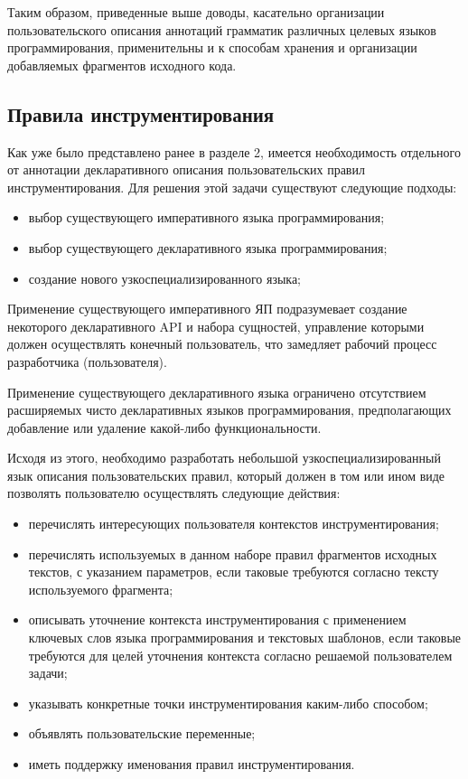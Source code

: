 Таким образом, приведенные выше доводы, касательно организации пользовательского описания аннотаций грамматик различных целевых языков программирования, применительны и к способам хранения и организации добавляемых фрагментов исходного кода.

\subsection{Правила инструментирования}

Как уже было представлено ранее в разделе 2, имеется необходимость отдельного от аннотации декларативного описания пользовательских правил инструментирования.
Для решения этой задачи существуют следующие подходы:
\begin{itemize}[noitemsep]
  \item выбор существующего императивного языка программирования;
  \item выбор существующего декларативного языка программирования;
  \item создание нового узкоспециализированного языка;
\end{itemize}

Применение существующего императивного ЯП подразумевает создание некоторого декларативного API и набора сущностей, управление которыми должен осуществлять конечный пользователь, что замедляет рабочий процесс разработчика (пользователя).

Применение существующего декларативного языка ограничено отсутствием расширяемых чисто декларативных языков программирования, предполагающих добавление или удаление какой-либо функциональности.

Исходя из этого, необходимо разработать небольшой узкоспециализированный язык описания пользовательских правил, который должен в том или ином виде позволять пользователю осуществлять следующие действия:
\begin{itemize}[noitemsep]
  \item перечислять интересующих пользователя контекстов инструментирования;
  \item перечислять используемых в данном наборе правил фрагментов исходных текстов, с указанием параметров, если таковые требуются согласно тексту используемого фрагмента;
  \item описывать уточнение контекста инструментирования с применением ключевых слов языка программирования и текстовых шаблонов, если таковые требуются для целей уточнения контекста согласно решаемой пользователем задачи;
  \item указывать конкретные точки инструментирования каким-либо способом;
  \item объявлять пользовательские переменные;
  \item иметь поддержку именования правил инструментирования.
\end{itemize}


